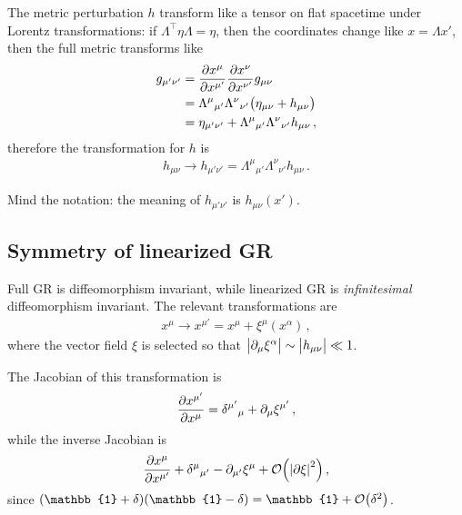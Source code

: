 \documentclass[main.tex]{subfiles}
\begin{document}
The metric perturbation \(h\) transform like a tensor on flat spacetime under Lorentz transformations: if \(\Lambda^{\top} \eta \Lambda = \eta \), then the coordinates change like \(x = \Lambda x'\), then the full metric transforms like
%
\begin{align}
g_{\mu ' \nu '} &= \pdv{x^{\mu }}{x^{\mu '}} \pdv{x^{\nu }}{x^{\nu '}} g_{\mu \nu }  \\
&= \Lambda^{\mu}{}_{\mu '} \Lambda^{\nu }{}_{\nu '} \qty(\eta_{\mu \nu } + h_{\mu \nu } )  \\
&= \eta_{\mu '\nu '} +  \Lambda^{\mu}{}_{\mu '} \Lambda^{\nu }{}_{\nu '}  h_{\mu \nu }
\,,
\end{align}
%
therefore the transformation for \(h\) is 
%
\begin{align}
h_{\mu \nu } \to h_{\mu ' \nu '} = \Lambda^{\mu }{}_{\mu ' } \Lambda^{\nu }{}_{\nu '} h_{\mu \nu }
\,.
\end{align}

Mind the notation: the meaning of \(h_{\mu ' \nu '}\) is \(h_{\mu \nu } (x')\).

\subsection{Symmetry of linearized GR}

Full GR is diffeomorphism invariant, while linearized GR is \emph{infinitesimal} diffeomorphism invariant. 
The relevant transformations are 
%
\begin{align}
x^{\mu } \to x^{\mu '} = x^{\mu } + \xi^{\mu } (x^{\alpha })
\,,
\end{align}
%
where the vector field \(\xi \) is selected so that \(\abs{\partial_{\mu } \xi^{\alpha }} \sim \abs{h_{\mu \nu }} \ll 1\). 

The Jacobian of this transformation is 
%
\begin{align}
\pdv{x^{\mu '}}{x^{\mu }} = \delta^{\mu '}{}_{\mu} + \partial_{\mu } \xi^{\mu '}
\,,
\end{align}
%
while the inverse Jacobian is 
%
\begin{align}
\pdv{x^{\mu }}{x^{\mu '}} + \delta^{\mu }{}_{\mu '} - \partial_{\mu '} \xi^{\mu } + \order{\abs{\partial \xi }^2}
\,,
\end{align}
%
since \((\mathbb{1} + \delta ) (\mathbb{1} - \delta ) = \mathbb{1} + \order{ \delta^2}\). 
\end{document}
